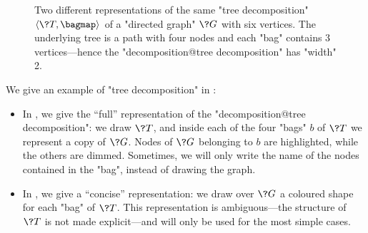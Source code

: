 \begin{figure}
	\centering
	\hfill
	\hfill
	\hfill
	\caption{
		\AP\label{fig:ex-tree-dec}
		Two different representations of the same "tree decomposition" $\tup{\?T, \bagmap}$ of a 
		"directed graph" $\?G$ with six 
		vertices. The underlying tree is a path with four nodes and each "bag" contains 3 
		vertices---hence the "decomposition@tree decomposition" has "width" 2.
	}
\end{figure}
We give an example of "tree decomposition" in :
\begin{itemize}
	\item In , we give the ``full'' representation of
	the "decomposition@tree decomposition": we draw $\?T$,
	and inside each of the four "bags" $b$ of $\?T$
	we represent a copy of $\?G$. Nodes of $\?G$ belonging to $b$ are highlighted, while the others are dimmed. Sometimes, we will only write the
	name of the nodes contained in the "bag", instead of drawing the graph.
	\item In , we give a ``concise'' representation:
	we draw over $\?G$ a coloured shape for each "bag" of $\?T$. This representation is ambiguous---the structure of $\?T$ is not made explicit---and will only be used for
	the most simple cases.
\end{itemize}

